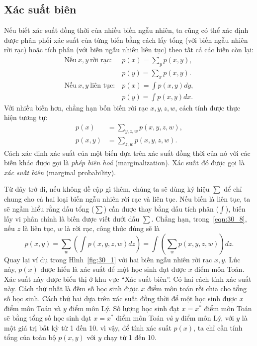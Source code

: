 \subsection{Xác suất biên}
Nếu biết xác suất đồng thời của nhiều biến ngẫu nhiên, ta cũng có thể xác định
được phân phối xác suất của từng biến bằng cách lấy tổng (với biến ngẫu nhiên rời
rạc) hoặc tích phân (với biến ngẫu nhiên liên tục) theo tất cả các biến còn lại:%
\begin{align}
\label{eqn:30_3}
  \text{Nếu} ~x, y ~\text{rời rạc:}~ &p(x) = \sum_{y}p(x, y), \\
  \label{eqn:30_4}
  &p(y) = \sum_{x}p(x, y). \\
\label{eqn:30_5}
  \text{Nếu} ~x, y ~\text{liên tục:}~ &p(x) = \int p(x, y)dy, \\
  \label{eqn:30_6}
  &p(y) = \int p(x, y)dx.
\end{align}
Với nhiều biến hơn, chẳng hạn bốn biến rời rạc $x, y, z, w$, cách tính được thực
hiện tương tự:
\begin{align}
\label{eqn:30_7}
   p(x) &= \sum \limits_{ y, z, w}p(x, y, z, w),\\
  \label{eqn:30_8}
  p(x, y) &= \sum \limits_{z, w}p(x, y, z, w).
\end{align}
Cách xác định xác suất của một biến dựa trên xác suất đồng thời của nó với các
biến khác được gọi là \textit{phép biên hoá} (marginalization). Xác suất đó được gọi là
\textit{xác suất biên} (marginal probability).


Từ đây trở đi, nếu không đề cập gì thêm, chúng ta sẽ dùng ký hiệu $\sum$ để chỉ
chung cho cả hai loại biến ngẫu nhiên rời rạc và liên tục. Nếu biến là liên tục,
ta sẽ ngầm hiểu rằng dấu tổng ($\sum$) cần được thay bằng dấu tích phân
($\int$), biến lấy vi phân chính là biến được viết dưới dấu $\sum$. Chẳng hạn,
trong~\eqref{eqn:30_8}, nếu $z$ là liên tục, $w$ là rời rạc, công thức đúng sẽ
là
\begin{equation}
  p(x, y) = \sum_{w}\left( \int p(x, y, z, w)dz \right) = \int \left( \sum_{w} p(x, y, z, w)\right) dz.
\end{equation}
Quay lại ví dụ trong Hình~\ref{fig:30_1} với hai biến ngẫu nhiên rời rạc $x, y$.
Lúc này, $p(x)$ được hiểu là xác suất để một học sinh đạt được $x$ điểm môn
Toán. Xác suất này được biểu thị ở khu vực ``Xác suất biên''. Có hai cách tính
xác suất này. Cách thứ nhất là đếm số học sinh được $x$ điểm môn toán rồi chia
cho tổng số học sinh. Cách thứ hai dựa trên xác suất đồng thời để một học sinh
được $x$ điểm môn Toán và $y$ điểm môn Lý. Số lượng học sinh đạt $x = x^*$ điểm
môn Toán sẽ bằng tổng số học sinh đạt $x = x^*$ điểm môn Toán \textit{và} $y$
điểm môn Lý, với $y$ là một giá trị bất kỳ từ 1 đến 10. vì vậy, để tính xác suất
$p(x)$, ta chỉ cần tính tổng của toàn bộ $p(x, y)$ với $y$ chạy từ 1 đến 10.

